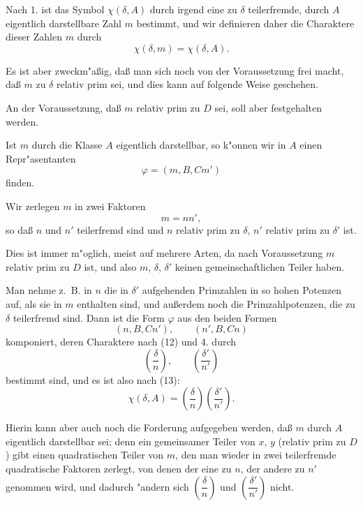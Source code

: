 \documentclass[11pt,a4paper]{article}
\theoremstyle{plain}
\begin{document}
Nach 1. ist das Symbol $\chi(\delta, A)$ durch irgend eine zu $\delta$ teilerfremde, durch $A$ eigentlich darstellbare Zahl $m$ bestimmt, und wir definieren daher die Charaktere dieser Zahlen $m$ durch
\begin{equation}
\label{eq:104_14}
\chi(\delta, m) = \chi(\delta, A).
\end{equation}

Es ist aber zweckm"{a}\ss{}ig, da\ss{} man sich noch von der Voraussetzung frei macht, da\ss{} $m$ zu $\delta$ relativ prim sei, und dies kann auf folgende Weise geschehen.

An der Voraussetzung, da\ss{} $m$ relativ prim zu $D$ sei, soll aber festgehalten werden.

Ist $m$ durch die Klasse $A$ eigentlich darstellbar, so k"{o}nnen wir in $A$ einen Repr"{a}sentanten
\begin{equation}
\label{eq:104_15}
\varphi = (m, B, Cm')
\end{equation}
finden.

Wir zerlegen $m$ in zwei Faktoren
\begin{equation}
\label{eq:104_16}
m = nn',
\end{equation}
so da\ss{} $n$ und $n'$ teilerfremd sind und $n$ relativ prim zu $\delta$, $n'$ relativ prim zu $\delta'$ ist.

Dies ist immer m"{o}glich, meist auf mehrere Arten, da nach Voraussetzung $m$ relativ prim zu $D$ ist, und also $m$, $\delta$, $\delta'$ keinen gemeinschaftlichen Teiler haben.

Man nehme z.~B. in $n$ die in $\delta'$ aufgehenden Primzahlen in so hohen Potenzen auf, als sie in $m$ enthalten sind, und au\ss{}erdem noch die Primzahlpotenzen, die zu $\delta$ teilerfremd sind. Dann ist die Form $\varphi$ aus den beiden Formen
\[
(n, B, Cn'), \qquad (n', B, Cn)
\]
komponiert, deren Charaktere nach (12) und 4. durch
\[
\left(\frac{\delta}{n}\right), \qquad \left(\frac{\delta'}{n'}\right)
\]
bestimmt sind, und es ist also nach (13):
\begin{equation}
\label{eq:104_17}
\chi(\delta, A) = \left(\frac{\delta}{n}\right)\left(\frac{\delta'}{n'}\right).
\end{equation}

Hierin kann aber auch noch die Forderung aufgegeben werden, da\ss{} $m$ durch $A$ eigentlich darstellbar sei; denn ein gemeinsamer Teiler von $x$, $y$ (relativ prim zu $D$) gibt einen quadratischen Teiler von $m$, den man wieder in zwei teilerfremde quadratische Faktoren zerlegt, von denen der eine zu $n$, der andere zu $n'$ genommen wird, und dadurch "{a}ndern sich $\left(\dfrac{\delta}{n}\right)$ und $\left(\dfrac{\delta'}{n'}\right)$ nicht.
\end{document}
